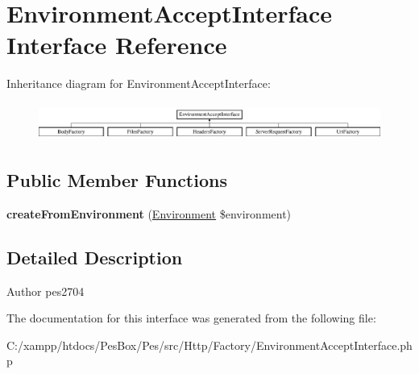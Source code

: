\hypertarget{interface_pes_1_1_http_1_1_factory_1_1_environment_accept_interface}{}\section{Environment\+Accept\+Interface Interface Reference}
\label{interface_pes_1_1_http_1_1_factory_1_1_environment_accept_interface}
Inheritance diagram for Environment\+Accept\+Interface\+:\begin{figure}[H]
\begin{center}
\leavevmode
\includegraphics[height=1.244444cm]{interface_pes_1_1_http_1_1_factory_1_1_environment_accept_interface}
\end{center}
\end{figure}
\subsection*{Public Member Functions}
\begin{DoxyCompactItemize}
\item 
\mbox{\label{interface_pes_1_1_http_1_1_factory_1_1_environment_accept_interface_aabcd9fd040e8ac574247abda286cb59f}} 
{\bfseries create\+From\+Environment} (\mbox{\hyperlink{class_pes_1_1_http_1_1_environment}{Environment}} \$environment)
\end{DoxyCompactItemize}


\subsection{Detailed Description}
\begin{DoxyAuthor}{Author}
pes2704 
\end{DoxyAuthor}


The documentation for this interface was generated from the following file\+:\begin{DoxyCompactItemize}
\item 
C\+:/xampp/htdocs/\+Pes\+Box/\+Pes/src/\+Http/\+Factory/Environment\+Accept\+Interface.\+php\end{DoxyCompactItemize}
